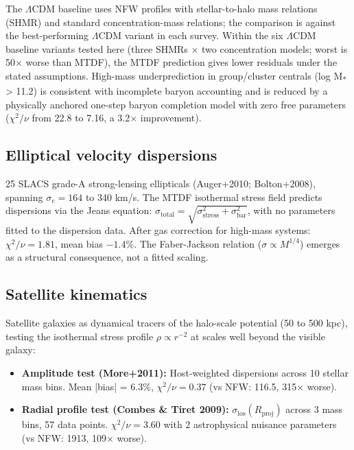 \documentclass[11pt,a4paper]{article}
\begin{document}
The $\Lambda$CDM baseline uses NFW profiles with stellar-to-halo mass relations (SHMR) and standard concentration-mass relations; the comparison is against the best-performing $\Lambda$CDM variant in each survey. Within the six $\Lambda$CDM baseline variants tested here (three SHMRs $\times$ two concentration models; worst is 50$\times$ worse than MTDF), the MTDF prediction gives lower residuals under the stated assumptions. High-mass underprediction in group/\allowbreak{}cluster centrals (log M\textsubscript{*} > 11.2) is consistent with incomplete baryon accounting and is reduced by a physically anchored one-step baryon completion model with zero free parameters ($\chi^2/\nu$ from 22.8 to 7.16, a 3.2$\times$ improvement).

\subsection{Elliptical velocity dispersions}
25 SLACS grade-A strong-lensing ellipticals (Auger+2010; Bolton+2008), spanning $\sigma_e = 164$ to 340 km/\allowbreak{}s. The MTDF isothermal stress field predicts dispersions via the Jeans equation: $\sigma_\text{total} = \sqrt{\sigma_\text{stress}^2 + \sigma_\text{bar}^2}$, with no parameters fitted to the dispersion data. After gas correction for high-mass systems: $\chi^2/\nu = 1.81$, mean bias $-1.4\%$. The Faber-Jackson relation ($\sigma \propto M^{1/4}$) emerges as a structural consequence, not a fitted scaling.

\subsection{Satellite kinematics}
Satellite galaxies as dynamical tracers of the halo-scale potential (50 to 500 kpc), testing the isothermal stress profile $\rho \propto r^{-2}$ at scales well beyond the visible galaxy:

\begin{itemize}
  \item \textbf{Amplitude test (More+2011):} Host-weighted dispersions across 10 stellar mass bins. Mean |bias| = 6.3\%, $\chi^2/\nu = 0.37$ (vs NFW: 116.5, 315$\times$ worse).
  \item \textbf{Radial profile test (Combes \& Tiret 2009):} $\sigma_\text{los}(R_\text{proj})$ across 3 mass bins, 57 data points. $\chi^2/\nu = 3.60$ with 2 astrophysical nuisance parameters (vs NFW: 1913, 109$\times$ worse).
\end{itemize}
\end{document}

